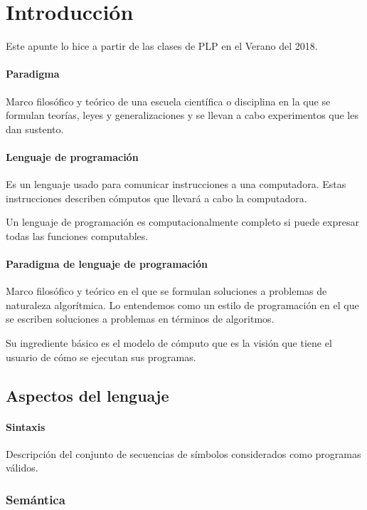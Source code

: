 \section{Introducción}

Este apunte lo hice a partir de las clases de PLP en el Verano del 2018.

\paragraph{Paradigma} Marco filosófico y teórico de una escuela científica o disciplina en la que se formulan teorías, leyes y generalizaciones y se llevan a cabo experimentos que les dan sustento.

\paragraph{Lenguaje de programación} Es un lenguaje usado para comunicar instrucciones a una computadora. Estas instrucciones describen cómputos que llevará a cabo la computadora.

Un lenguaje de programación es computacionalmente completo si puede expresar todas las funciones computables.

\paragraph{Paradigma de lenguaje de programación} Marco filosófico y teórico en el que se formulan soluciones a problemas de naturaleza algorítmica. Lo entendemos como un estilo de programación en el que se escriben soluciones a problemas en términos de algoritmos.

Su ingrediente básico es el modelo de cómputo que es la visión que tiene el usuario de cómo se ejecutan sus programas.

\subsection{Aspectos del lenguaje}

\paragraph{Sintaxis} Descripción del conjunto de secuencias de símbolos considerados como programas válidos.

\subsubsection{Semántica}


